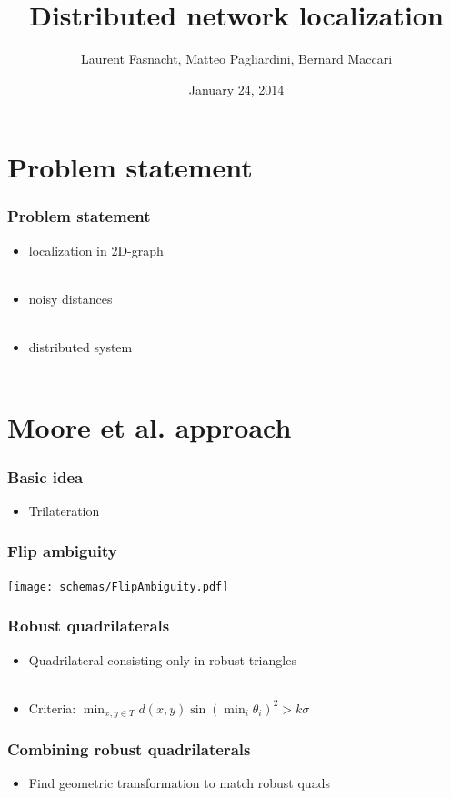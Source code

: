 \documentclass{beamer}
\title{Distributed network localization}
\author{Laurent Fasnacht, Matteo Pagliardini, Bernard Maccari}
\institute{Distributed Intelligent Systems}
\date{January 24, 2014}
\begin{document}
\begin{frame}
  \titlepage
\end{frame}

\section{Problem statement}

\begin{frame}
    \frametitle{Problem statement}
    \begin{itemize}
        \item localization in 2D-graph \\~
        \item noisy distances \\~
        \item distributed system \\~
    \end{itemize}
\end{frame}

\section{Moore et al. approach}

\begin{frame}
    \frametitle{Basic idea}
    \begin{itemize}
        \item Trilateration
    \end{itemize}
\end{frame}

\begin{frame}
    \frametitle{Flip ambiguity}
    \texttt{[image: schemas/FlipAmbiguity.pdf]}
\end{frame}

\begin{frame}
    \frametitle{Robust quadrilaterals}
    
    \begin{itemize}
        \item Quadrilateral consisting only in robust triangles \\~
        \item Criteria: $\min_{x,y \in T} d(x,y) \sin(\min_i \theta_i)^2 > k \sigma$
    \end{itemize}
\end{frame}

\begin{frame}
    \frametitle{Combining robust quadrilaterals}
    
    \begin{itemize}
        \item Find geometric transformation to match robust quads
    \end{itemize}
\end{frame}
\end{document}
